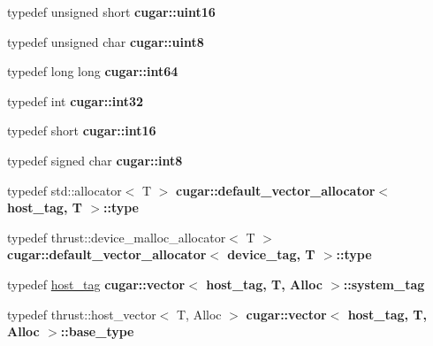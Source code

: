 \begin{DoxyCompactItemize}
\mbox{\label{group___basic_ga9f135df7edf3362f67b4d63fea91ca51}} 
typedef unsigned short {\bfseries cugar\+::uint16}
\item 
\mbox{\label{group___basic_gaa27be4af3712b1c9699b2b731706ad1d}} 
typedef unsigned char {\bfseries cugar\+::uint8}
\item 
\mbox{\label{group___basic_ga186ad3e3e94ee8f4552f49532cee8d93}} 
typedef long long {\bfseries cugar\+::int64}
\item 
\mbox{\label{group___basic_ga16e25ebb3aa0f9ccac572cee6cd289d1}} 
typedef int {\bfseries cugar\+::int32}
\item 
\mbox{\label{group___basic_ga62b5ff90591441d31547ca05904c9265}} 
typedef short {\bfseries cugar\+::int16}
\item 
\mbox{\label{group___basic_gad25b310b0f9eb836caf3378b0787a2b3}} 
typedef signed char {\bfseries cugar\+::int8}
\item 
\mbox{\label{group___basic_gab7a5cfa78a406d68a6fd0c4f0de62cf5}} 
typedef std\+::allocator$<$ T $>$ {\bfseries cugar\+::default\+\_\+vector\+\_\+allocator$<$ host\+\_\+tag, T $>$\+::type}
\item 
\mbox{\label{group___basic_ga6ce1404725a76cfc14a7ab652710118c}} 
typedef thrust\+::device\+\_\+malloc\+\_\+allocator$<$ T $>$ {\bfseries cugar\+::default\+\_\+vector\+\_\+allocator$<$ device\+\_\+tag, T $>$\+::type}
\item 
\mbox{\label{group___basic_gab16567bf9c580f5b328ae7ccb91c1739}} 
typedef \hyperlink{structcugar_1_1host__tag}{host\+\_\+tag} {\bfseries cugar\+::vector$<$ host\+\_\+tag, T, Alloc $>$\+::system\+\_\+tag}
\item 
\mbox{\label{group___basic_gaa47062014dc903cc25bec22527505720}} 
typedef thrust\+::host\+\_\+vector$<$ T, Alloc $>$ {\bfseries cugar\+::vector$<$ host\+\_\+tag, T, Alloc $>$\+::base\+\_\+type}
\item 
\mbox{\label{group___basic_ga361c037afcd19bb11eac7d767cd75f9c}} 

\end{DoxyCompactItemize}
